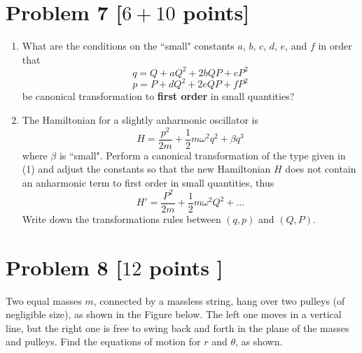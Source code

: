 \documentclass[11pt, a4paper]{article} %
\begin{document}
\newpage
\section*{Problem 7 [$6 + 10$ points]}
\begin{enumerate}
\item[(1)]  What are the conditions on the ``small" constants $a$, $b$, $c$, $d$, $e$, and $f$ in order that 
\begin{equation*}
    q= Q+ aQ^2+2bQP + cP^2
\end{equation*}
\begin{equation*}
   p=P+dQ^2+2eQP+fP^2
\end{equation*}
be canonical transformation to \textbf{first order} in small quantities?

\item[(2)] The Hamiltonian for a slightly anharmonic oscillator is 
\begin{equation*}
   H=\frac{p^2}{2m} + \frac{1}{2}m\omega^2q^2 + \beta q^3
\end{equation*}
where $\beta$ is ``small". Perform a canonical transformation of the type given in (1) and adjust the constants so that the new Hamiltonian $H$ does not contain an anharmonic term to first order in small quantities, thus 
\begin{equation*}
   H'=\frac{P^2}{2m} + \frac{1}{2}m\omega^2Q^2 + ...
\end{equation*}
Write down the transformations rules between $(q, p)$ and $(Q, P)$.
\end{enumerate}



\newpage
\section*{Problem 8 [$12$ points ]}
Two equal masses $m$, connected by a massless string, hang over two pulleys (of negligible size), as shown in the Figure below. The left one moves in a vertical line, but the right one is free to swing back and forth in the plane of the masses and pulleys. Find the equations of motion for $r$ and $\theta$, as shown.
\end{document}
